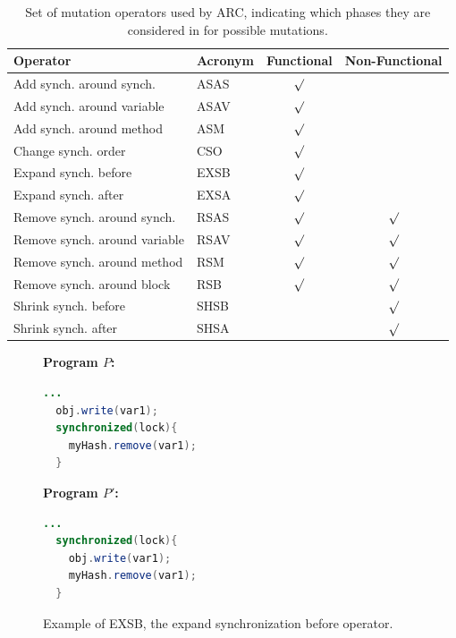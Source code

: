 \documentclass[10pt, conference, compsocconf]{IEEEtran}
\begin{document}
\begin{table}
\begin{center}
\begin{tabular}{|l|l|c|c|}
\hline
\textbf{Operator} &
\textbf{Acronym} &
\textbf{Functional} &
\textbf{Non-Functional}
\\\hline
Add synch. around synch. & ASAS & $\surd$ &
\\\hline
Add synch. around variable & ASAV & $\surd$ &
\\\hline
Add synch. around method & ASM & $\surd$ &
\\\hline
Change synch. order & CSO & $\surd$ &
\\\hline
Expand synch. before & EXSB & $\surd$ &
\\\hline
Expand synch. after & EXSA & $\surd$ &
\\\hline
Remove synch. around synch. & RSAS & $\surd$ & $\surd$
\\\hline
Remove synch. around variable & RSAV & $\surd$ & $\surd$
\\\hline
Remove synch. around method & RSM & $\surd$ & $\surd$
\\\hline
Remove synch. around block & RSB & $\surd$ & $\surd$
\\\hline
Shrink synch. before & SHSB & & $\surd$
\\\hline
Shrink synch. after & SHSA & & $\surd$
\\\hline
\end{tabular}
\caption{Set of mutation operators used by ARC, indicating which phases they
are considered in for possible mutations.}
\label{tbl:operators}
\end{center}
\end{table}

\begin{figure}[h!]
\vspace{2mm}
\begin{minipage}{3.70cm}

\footnotesize{\textbf{ Program $P$:}}
\begin{lstlisting}[language=Java]
  ...
  obj.write(var1);
  synchronized(lock){
    myHash.remove(var1);
  }
\end{lstlisting}
\end{minipage}\hfill
\begin{minipage}{3.70cm}
\footnotesize{\textbf{ Program $P'$:}}
\begin{lstlisting}[language=Java]
  ...
  synchronized(lock){
    obj.write(var1);
    myHash.remove(var1);
  }
\end{lstlisting}
\end{minipage}

\caption{Example of EXSB, the expand synchronization before operator.}
\label{fig:EXSB_example}
\end{figure}
\end{document}
